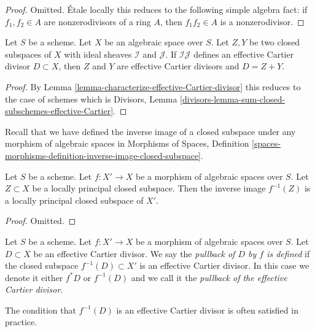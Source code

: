 \begin{proof}
Omitted. \'Etale locally this reduces to the following simple
algebra fact: if $f_1, f_2 \in A$ are nonzerodivisors of a ring $A$, then
$f_1f_2 \in A$ is a nonzerodivisor.
\end{proof}

\begin{lemma}
\label{lemma-sum-closed-subschemes-effective-Cartier}
Let $S$ be a scheme. Let $X$ be an algebraic space over $S$.
Let $Z, Y$ be two closed subspaces of $X$
with ideal sheaves $\mathcal{I}$ and $\mathcal{J}$. If $\mathcal{I}\mathcal{J}$
defines an effective Cartier divisor $D \subset X$, then $Z$ and $Y$
are effective Cartier divisors and $D = Z + Y$.
\end{lemma}

\begin{proof}
By Lemma \ref{lemma-characterize-effective-Cartier-divisor}
this reduces to the case of schemes which is
Divisors, Lemma \ref{divisors-lemma-sum-closed-subschemes-effective-Cartier}.
\end{proof}

\noindent
Recall that we have defined the inverse image of a closed subspace
under any morphism of algebraic spaces in
Morphisms of Spaces, Definition
\ref{spaces-morphisms-definition-inverse-image-closed-subspace}.

\begin{lemma}
\label{lemma-pullback-locally-principal}
Let $S$ be a scheme.
Let $f : X' \to X$ be a morphism of algebraic spaces over $S$.
Let $Z \subset X$ be a locally principal closed subspace.
Then the inverse image $f^{-1}(Z)$ is a locally principal closed
subspace of $X'$.
\end{lemma}

\begin{proof}
Omitted.
\end{proof}

\begin{definition}
\label{definition-pullback-effective-Cartier-divisor}
Let $S$ be a scheme.
Let $f : X' \to X$ be a morphism of algebraic spaces over $S$.
Let $D \subset X$
be an effective Cartier divisor. We say the {\it pullback of
$D$ by $f$ is defined} if the closed subspace $f^{-1}(D) \subset X'$
is an effective Cartier divisor. In this case we denote it either
$f^*D$ or $f^{-1}(D)$ and we call it the
{\it pullback of the effective Cartier divisor}.
\end{definition}

\noindent
The condition that $f^{-1}(D)$ is an effective Cartier divisor
is often satisfied in practice.

